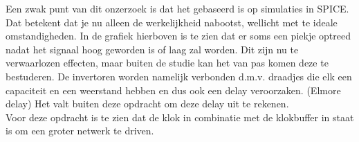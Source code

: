 \documentclass{report}
\begin{document}
Een zwak punt van dit onzerzoek is dat het gebaseerd is op simulaties in SPICE. Dat betekent dat je nu alleen de werkelijkheid nabootst, wellicht met te ideale omstandigheden. In de grafiek hierboven is te zien dat er soms een piekje optreed nadat het signaal hoog geworden is of laag zal worden. Dit zijn nu te verwaarlozen effecten, maar buiten de studie kan het van pas komen deze te bestuderen. De invertoren worden namelijk verbonden d.m.v. draadjes die elk een capaciteit en een weerstand hebben en dus ook een delay veroorzaken. (Elmore delay) 
Het valt buiten deze opdracht om deze delay uit te rekenen.  \newline \\
Voor deze opdracht is te zien dat de klok in combinatie met de klokbuffer in staat is om een groter netwerk te driven.  
\end{document}
